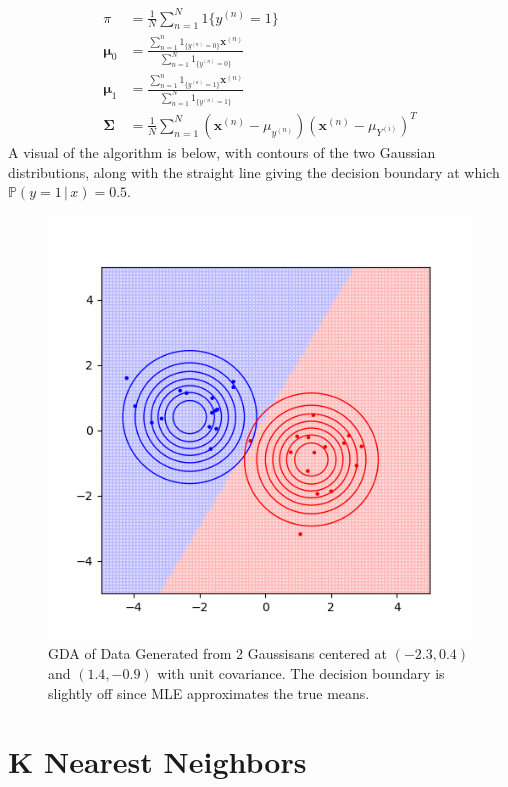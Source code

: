 \documentclass{article}
\theoremstyle{definition}
\theoremstyle{remark}
\theoremstyle{definition}
\begin{document}
\begin{align*}
    \pi & = \frac{1}{N} \sum_{n=1}^N 1\{y^{(n)} = 1\} \\
    \boldsymbol{\mu}_0 & = \frac{\sum_{n=1}^n 1_{\{y^{(n)} = 0 \}} \mathbf{x}^{(n)}}{\sum_{n=1}^N 1_{\{y^{(n)} = 0 \}}} \\
    \boldsymbol{\mu}_1 & = \frac{\sum_{n=1}^n 1_{\{y^{(n)} = 1\}} \mathbf{x}^{(n)}}{\sum_{n=1}^N 1_{\{y^{(n)} = 1 \}}} \\
    \boldsymbol{\Sigma} & = \frac{1}{N} \sum_{n=1}^N (\mathbf{x}^{(n)} - \mu_{y^{(n)}}) (\mathbf{x}^{(n)} - \mu_{Y^{(i)}})^T 
\end{align*}
A visual of the algorithm is below, with contours of the two Gaussian distributions, along with the straight line giving the decision boundary at which $\mathbb{P}(y=1\,|\,x) = 0.5$. 
\begin{figure}
    \centering
    \includegraphics[scale=0.7]{Section_3/GDA.png}
    \caption{GDA of Data Generated from 2 Gaussisans centered at $(-2.3, 0.4)$ and $(1.4, -0.9)$ with unit covariance. The decision boundary is slightly off since MLE approximates the true means. }
    \label{fig:enter-label}
\end{figure}

\section{K Nearest Neighbors}      
\end{document}
